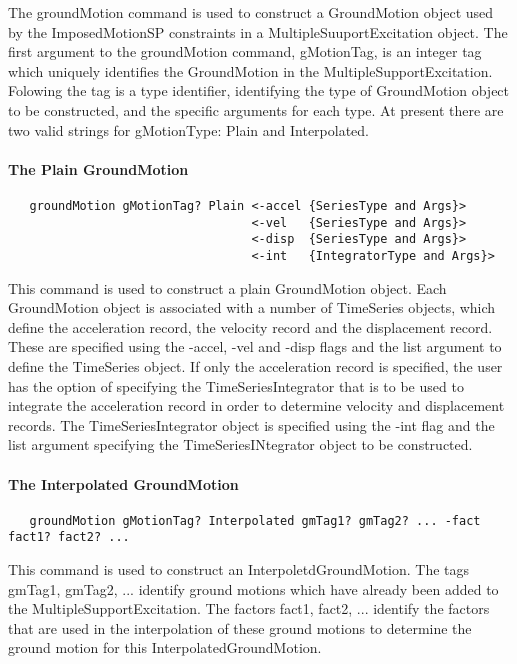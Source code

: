 \documentclass[12pt]{article}
\begin{document}
The groundMotion command is used to construct a GroundMotion object
used by the ImposedMotionSP constraints in a MultipleSuuportExcitation
object. The first argument to the groundMotion command, gMotionTag, is
an integer tag which uniquely identifies the GroundMotion in the
MultipleSupportExcitation. Folowing the tag is a type identifier,
identifying the type of GroundMotion object to be constructed, and the
specific arguments for each type. At present there are two valid
strings for gMotionType: Plain and Interpolated.

\paragraph{\small The Plain GroundMotion}

{\sf\small
\begin{verbatim}
   groundMotion gMotionTag? Plain <-accel {SeriesType and Args}>
                                  <-vel   {SeriesType and Args}>
                                  <-disp  {SeriesType and Args}>
                                  <-int   {IntegratorType and Args}>
\end{verbatim}
}

This command is used to construct a plain GroundMotion object. Each
GroundMotion object is associated with a number of TimeSeries objects,
which define the acceleration record, the velocity record and the
displacement record. These are specified using the -accel, -vel and
-disp flags and the list argument to define the TimeSeries object. If
only the acceleration record is specified, the user has the option of
specifying the TimeSeriesIntegrator that is to be used to integrate
the acceleration record in order to determine velocity and displacement
records. The TimeSeriesIntegrator object is specified using the -int
flag and the list argument specifying the TimeSeriesINtegrator object
to be constructed.

\paragraph{\small The Interpolated GroundMotion}

{\sf\small
\begin{verbatim}
   groundMotion gMotionTag? Interpolated gmTag1? gmTag2? ... -fact fact1? fact2? ...
\end{verbatim}
}

This command is used to construct an InterpoletdGroundMotion. The tags
gmTag1, gmTag2, ... identify ground motions which have already been
added to the MultipleSupportExcitation. The factors fact1, fact2,
... identify the factors that are used in the interpolation of these
ground motions to determine the ground motion for this
InterpolatedGroundMotion.
\end{document}
